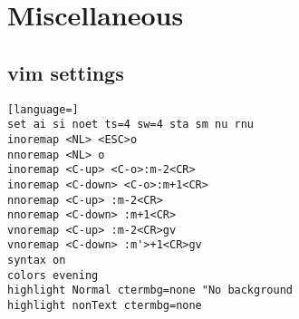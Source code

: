 \documentclass{article}
\begin{document}
\section{Miscellaneous}
\subsection{vim settings}
\begin{lstlisting}[language=]
set ai si noet ts=4 sw=4 sta sm nu rnu
inoremap <NL> <ESC>o
nnoremap <NL> o
inoremap <C-up> <C-o>:m-2<CR>
inoremap <C-down> <C-o>:m+1<CR>
nnoremap <C-up> :m-2<CR>
nnoremap <C-down> :m+1<CR>
vnoremap <C-up> :m-2<CR>gv
vnoremap <C-down> :m'>+1<CR>gv
syntax on
colors evening
highlight Normal ctermbg=none "No background
highlight nonText ctermbg=none
\end{lstlisting}


\end{document}
